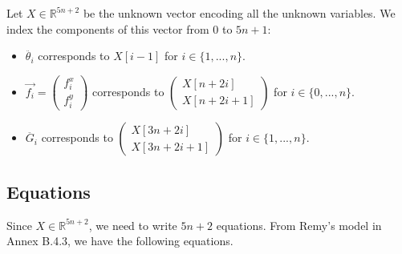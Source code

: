 \documentclass{article}
\begin{document}
Let $X \in \mathbb{R}^{5n+2}$ be the unknown vector encoding all the unknown variables. We index the components of this vector from $0$ to $5n+1$:
\begin{itemize}
  \item $\ddot{\theta_i}$ corresponds to $X[i-1]$ for $i \in \{1, ..., n\}$.
  \item $\vec{f_i}=\begin{pmatrix} f_i^x \\ f_i^y \end{pmatrix}$ corresponds to     
    $\begin{pmatrix}
        X[n+2i] \\
        X[n+2i+1] 
    \end{pmatrix}$ for $i \in \{0, ..., n\}$.
  \item $\ddot{G_i}$ corresponds to 
    $\begin{pmatrix}
        X[3n+2i] \\
        X[3n+2i+1] 
    \end{pmatrix}$ for $i \in \{1, ..., n\}$.
\end{itemize}

\subsection{Equations}
Since $X \in \mathbb{R}^{5n+2}$, we need to write $5n+2$ equations. From Remy's model \cite{Coulom-2002a} in Annex B.4.3, we have the following equations.
\end{document}
